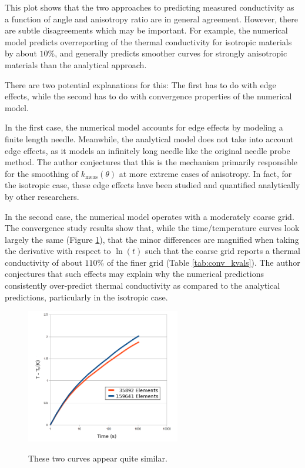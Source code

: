 This plot shows that the two approaches to predicting measured conductivity
as a function of angle and anisotropy ratio are in general agreement. However,
there are subtle disagreements which may be important. For example, the
numerical model predicts overreporting of the thermal conductivity for
isotropic materials by about \(10\%\), and generally predicts smoother
curves for strongly anisotropic materials than the analytical approach.

There are two potential explanations for this: The first has to do with edge
effects, while the second has to do with convergence properties of the numerical
model.

In the first case, the numerical model accounts for edge effects by
modeling a finite length needle. Meanwhile, the analytical model does not take
into account edge effects, as it models an infinitely long needle like the
original needle probe method. The author conjectures that this is the mechanism
primarily responsible for the smoothing of \(k_{\textrm{meas}}(\theta)\) at more extreme
cases of anisotropy. In fact, for the isotropic case, these edge effects have
been studied and quantified analytically by other researchers. \cite{axialerror}


In the second case, the numerical model operates with a moderately coarse grid.
The convergence study results show that, while the time/temperature curves look
largely the same (Figure \ref{fig:conv_curves}), that the minor differences are magnified when taking the
derivative with respect to \(\ln(t)\) such that the coarse grid reports a
thermal conductivity of about \(110\%\) of the finer grid (Table \ref{tab:conv_kvals}). The author
conjectures that such effects may explain why the numerical predictions
consistently over-predict thermal conductivity as compared to the analytical
predictions, particularly in the isotropic case.


\begin{figure}[h]
\centering
\includegraphics[width=0.6\textwidth]{fig/conv_curves.png}
\label{fig:conv_curves}
\caption{These two curves appear quite similar.}
\end{figure}


